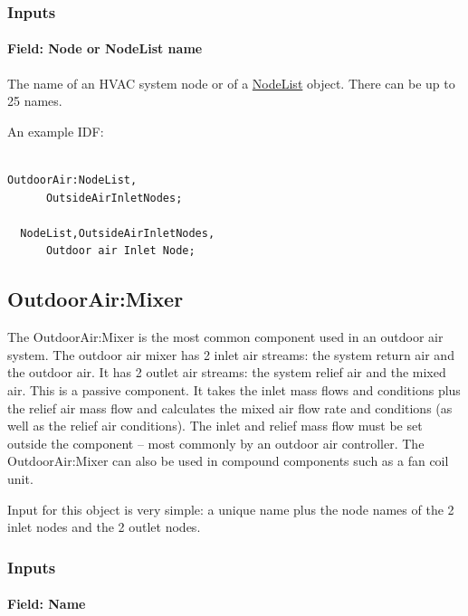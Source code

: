 \subsubsection{Inputs}\label{inputs-6-001}

\paragraph{Field: Node or NodeList name}\label{field-node-or-nodelist-name}

The name of an HVAC system node or of a \hyperref[nodelist]{NodeList} object. There can be up to 25 names.

An example IDF:

\begin{lstlisting}

OutdoorAir:NodeList,
      OutsideAirInletNodes;

  NodeList,OutsideAirInletNodes,
      Outdoor air Inlet Node;
\end{lstlisting}

\subsection{OutdoorAir:Mixer}\label{outdoorairmixer}

The OutdoorAir:Mixer is the most common component used in an outdoor air system. The outdoor air mixer has 2 inlet air streams: the system return air and the outdoor air. It has 2 outlet air streams: the system relief air and the mixed air. This is a passive component. It takes the inlet mass flows and conditions plus the relief air mass flow and calculates the mixed air flow rate and conditions (as well as the relief air conditions). The inlet and relief mass flow must be set outside the component -- most commonly by an outdoor air controller. The OutdoorAir:Mixer can also be used in compound components such as a fan coil unit.

Input for this object is very simple: a unique name plus the node names of the 2 inlet nodes and the 2 outlet nodes.

\subsubsection{Inputs}\label{inputs-7-001}

\paragraph{Field: Name}\label{field-name-6-001}

